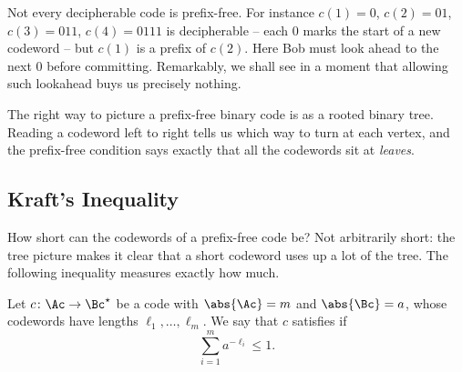 Not every decipherable code is prefix-free. For instance $c(1) = 0$, $c(2) = 01$, $c(3) = 011$, $c(4) = 0111$ is decipherable -- each $0$ marks the start of a new codeword -- but $c(1)$ is a prefix of $c(2)$. Here Bob must look ahead to the next $0$ before committing. Remarkably, we shall see in a moment that allowing such lookahead buys us precisely nothing.

The right way to picture a prefix-free binary code is as a rooted binary tree. Reading a codeword left to right tells us which way to turn at each vertex, and the prefix-free condition says exactly that all the codewords sit at \emph{leaves}.

\begin{center}
\end{center}

\subsection{Kraft's Inequality}

How short can the codewords of a prefix-free code be? Not arbitrarily short: the tree picture makes it clear that a short codeword uses up a lot of the tree. The following inequality measures exactly how much.

\begin{definition}
	Let $c \colon \Ac \to \Bc^\star$ be a code with $\abs{\Ac} = m$ and $\abs{\Bc} = a$, whose codewords have lengths $\ell_1, \dots, \ell_m$. We say that $c$ satisfies  if
	$$\sum_{i=1}^m a^{-\ell_i} \le 1.$$
\end{definition}

